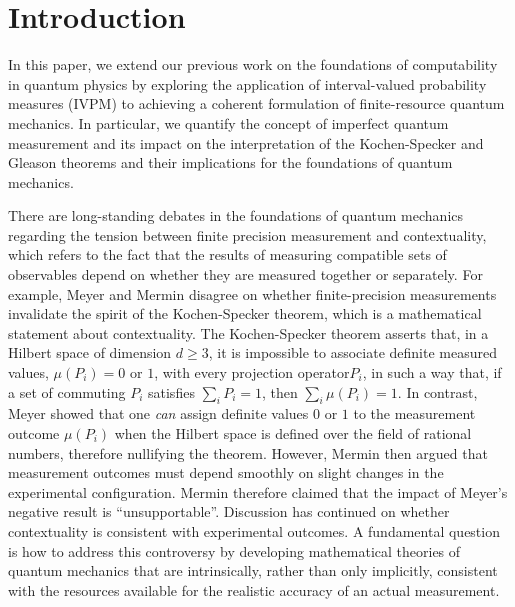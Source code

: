 \documentclass[english,reprint, aps, prl,superscriptaddress, showpacs,
showkeys, longbibliography, amsmath, amssymb]{revtex4-1}
\theoremstyle{plain}
\theoremstyle{definition}
\newcommand{\nb}{\nolinebreak[1] }
\begin{document}
\section{Introduction}

In this paper, we extend our previous work on the foundations of
computability in quantum physics by exploring the application of
interval-valued probability measures (IVPM) to achieving a coherent
formulation of finite-resource quantum mechanics.  In particular, we quantify the concept of imperfect quantum measurement and its impact on the interpretation of the Kochen-Specker and Gleason theorems and their implications for the foundations of quantum mechanics. 

There are long-standing debates in the foundations of quantum
mechanics regarding the tension between finite precision measurement
and contextuality\nb\cite{BarrettKent2004,Appleby_2005}, which refers to the fact that the results of measuring compatible sets of observables depend  on whether they are measured together or separately.  For example,
Meyer\nb\cite{PhysRevLett.83.3751} and Mermin\nb\cite{Mermin1999} disagree
on whether finite-precision measurements invalidate the spirit of the Kochen-Specker
theorem\nb\cite{kochenspecker1967,peres1995quantum}, which is a mathematical statement about contextuality.   The Kochen-Specker theorem asserts that, in a Hilbert space of dimension
$d \ge 3$, it is impossible to associate definite measured values, $\mu(P_i)= 0$
or $1$, with every projection operator\nb$P_i$, in such a way that, if a set of commuting $P_i$ satisfies $\sum_i P_i = 1$, then $\sum_i \mu(P_i) = 1$. In contrast, Meyer showed that 
one {\it can\/}  assign definite values $0$ or $1$ to the measurement outcome $\mu(P_i)$ when the Hilbert space is defined over the field of rational numbers, therefore nullifying the theorem\nb\citep{PhysRevLett.83.3751}.
However, Mermin then argued that measurement outcomes must depend smoothly
on slight changes in the experimental configuration. Mermin therefore claimed that 
the impact of Meyer's negative result  is ``unsupportable''\nb\citep{Mermin1999}. 
Discussion
has continued on whether contextuality is consistent with  experimental outcomes\nb\cite{Spekkens2005,GuehneKleinmannCabelloEtAl2010,MazurekPuseyKunjwalEtAl2016}.
A fundamental question is how to address this controversy by developing
 mathematical theories of quantum mechanics that are intrinsically, rather than only implicitly, consistent with the resources available for the realistic accuracy of an actual measurement.
\end{document}
